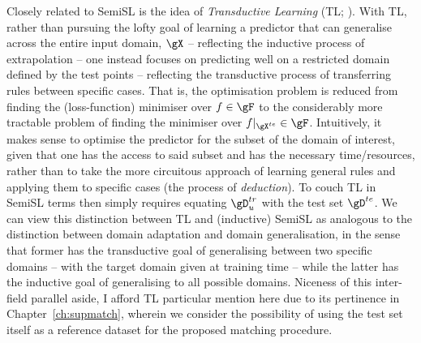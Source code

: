 %
Closely related to \ac{SemiSL} is the idea of \emph{Transductive Learning} (TL;
\citealp{gammerman1998learning}).
%
With TL, rather than pursuing the lofty goal of learning a predictor that can generalise across the
entire input domain, \( \gX \) -- reflecting the inductive process of extrapolation -- one instead
focuses on predicting well on a restricted domain defined by the test points -- reflecting the
transductive process of transferring rules between specific cases. 
%
%
That is, the optimisation problem is reduced from finding the (loss-function) minimiser over \(f
\in \gF \)  to the considerably more tractable problem of finding the minimiser over \(
f|_{\gX^{te}} \in \gF \).
%
Intuitively, it makes sense to optimise the predictor for the subset of the domain of interest,
given that one has the access to said subset and has the necessary time/resources, rather than to
take the more circuitous approach of learning general rules and applying them to specific cases
(the process of \emph{deduction}).
%
To couch TL in \ac{SemiSL} terms then simply requires equating \(\gD^{tr}_u \) with the test set
\(\gD^{te} \).
%
We can view this distinction between TL and (inductive) \ac{SemiSL} as analogous to the distinction
between domain adaptation and domain generalisation, in the sense that former has the transductive
goal of generalising between two specific domains -- with the target domain given at training time
-- while the latter has the inductive goal of generalising to all possible domains.
%
Niceness of this inter-field parallel aside, I afford TL particular mention here due to its
pertinence in Chapter~\ref{ch:supmatch}, wherein we consider the possibility of using the test set
itself as a reference dataset for the proposed matching procedure.


